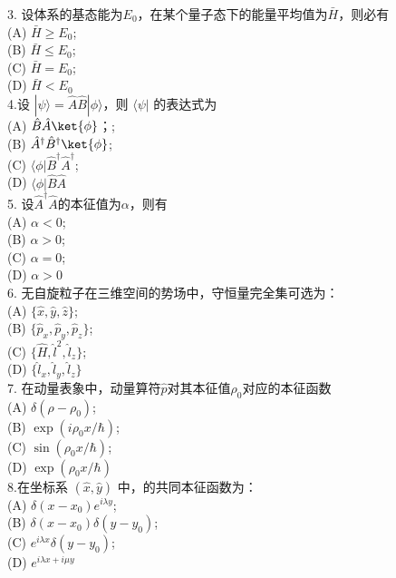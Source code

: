 3. 设体系的基态能为$E_0$，在某个量子态下的能量平均值为$\bar{H} $，则必有\\
   (A) $\bar{H} \geq E_0$; \\
   (B) $\bar{H} \leq E_0$; \\
   (C) $\bar{H} = E_0$; \\
   (D) $\bar{H}< E_0$\\

4.设 $|\psi\rangle = \hat{A}\hat{B}|\phi\rangle$，则 $\langle \psi |$ 的表达式为\\
   (A) $\hat{B} \hat{A}\ket{\phi}$；; \\
   (B) $ \hat{A}^\dagger \hat{B}^\dagger \ket{\phi}$; \\
   (C) $\langle \phi | \hat{B}^{\dagger} \hat{A}^{\dagger}$; \\
   (D)  $\langle \phi | \hat{B} \hat{A}$\\

5. 设$\hat{A}^\dagger \hat{A}$的本征值为$\alpha$，则有\\
   (A) $\alpha<0$; \\
   (B) $\alpha>0$; \\
   (C) $\alpha=0$; \\
   (D) $\alpha>0$\\

6. 无自旋粒子在三维空间的势场中，守恒量完全集可选为：\\
   (A) $\{\hat{x}, \hat{y}, \hat{z}\}$; \\
   (B)  $\{\hat{p}_x, \hat{p}_y,\hat{p}_z\}$; \\
   (C) $\{\hat{H},\hat{l}^2,  \hat{l}_z\}$; \\
   (D) $\{\hat{l}_x, \hat{l}_y,\hat{l}_z\}$\\

7. 在动量表象中，动量算符$\hat{p}$对其本征值$\rho_0$对应的本征函数\\
   (A) $\delta(\rho-\rho_0)$; \\
   (B) $\exp(i\rho_0 x/\hbar)$; \\
   (C) $\sin(\rho_0 x/\hbar)$; \\
   (D) $\exp(\rho_0 x/\hbar)$\\

8.在坐标系 $(\hat{x}, \hat{y})$ 中，的共同本征函数为：\\
   (A) $\delta(x-x_0)e^{i\lambda y}$; \\
   (B) $\delta(x-x_0)\delta(y-y_0)$; \\
   (C) $e^{i\lambda x} \delta(y-y_0)$; \\
   (D) $e^{i\lambda x + i\mu y}$\\

